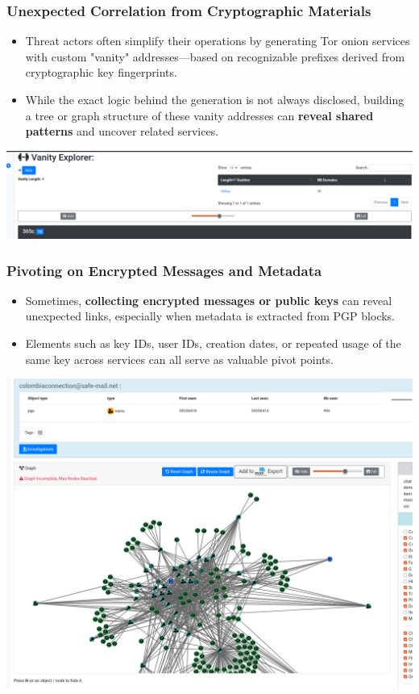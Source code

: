 \documentclass[10pt,aspectratio=169, colorlinks=true, linkcolor=circlBlue]{beamer}
\begin{document}
\begin{frame}
    \frametitle{Unexpected Correlation from Cryptographic Materials}
    \begin{itemize}
        \item Threat actors often simplify their operations by generating Tor onion services with custom "vanity" addresses—based on recognizable prefixes derived from cryptographic key fingerprints.
	\item While the exact logic behind the generation is not always disclosed, building a tree or graph structure of these vanity addresses can {\bf reveal shared patterns} and uncover related services.
    \end{itemize}
    \begin{center}
        \includegraphics[scale=0.25]{./img/crypto-part.png}
    \end{center}
\end{frame}

\begin{frame}
    \frametitle{Pivoting on Encrypted Messages and Metadata}
    \begin{itemize}
	    \item Sometimes, {\bf collecting encrypted messages or public keys} can reveal unexpected links, especially when metadata is extracted from PGP blocks.
        \item Elements such as key IDs, user IDs, creation dates, or repeated usage of the same key across services can all serve as valuable pivot points.
    \end{itemize}
    \begin{center}
        \includegraphics[scale=0.15]{./img/pgp-email.png}
    \end{center}
\end{frame}
\end{document}
